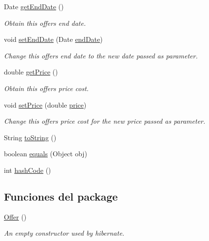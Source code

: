 \begin{DoxyCompactItemize}
Date \mbox{\hyperlink{classcom_1_1ruralhousejsf_1_1domain_1_1_offer_aa6adb6e4f0999247d9426233f62b2185}{get\+End\+Date}} ()
\begin{DoxyCompactList}\small\item\em Obtain this offers end date. \end{DoxyCompactList}\item 
void \mbox{\hyperlink{classcom_1_1ruralhousejsf_1_1domain_1_1_offer_a4ee5091e976e14c9b34817e1c8225e01}{set\+End\+Date}} (Date \mbox{\hyperlink{classcom_1_1ruralhousejsf_1_1domain_1_1_offer_a315f9b97f02da79a97fa489db212b5ce}{end\+Date}})
\begin{DoxyCompactList}\small\item\em Change this offers end date to the new date passed as parameter. \end{DoxyCompactList}\item 
double \mbox{\hyperlink{classcom_1_1ruralhousejsf_1_1domain_1_1_offer_a498e3f0617a7a097d68857ce20e6addd}{get\+Price}} ()
\begin{DoxyCompactList}\small\item\em Obtain this offers price cost. \end{DoxyCompactList}\item 
void \mbox{\hyperlink{classcom_1_1ruralhousejsf_1_1domain_1_1_offer_aaf77b7df1299a14ecc9cae2040dec6af}{set\+Price}} (double \mbox{\hyperlink{classcom_1_1ruralhousejsf_1_1domain_1_1_offer_a2106c38f0c490e3263b1364c3ac56b0a}{price}})
\begin{DoxyCompactList}\small\item\em Change this offers price cost for the new price passed as parameter. \end{DoxyCompactList}\item 
String \mbox{\hyperlink{classcom_1_1ruralhousejsf_1_1domain_1_1_offer_a91920170708c786730b8707d51d5a810}{to\+String}} ()
\item 
boolean \mbox{\hyperlink{classcom_1_1ruralhousejsf_1_1domain_1_1_offer_aea11cafbf3e7304d38630b80a3f4dc1e}{equals}} (Object obj)
\item 
int \mbox{\hyperlink{classcom_1_1ruralhousejsf_1_1domain_1_1_offer_aad4fd5441e084e41b30bb1d8d3597c48}{hash\+Code}} ()
\end{DoxyCompactItemize}
\subsection*{Funciones del \textquotesingle{}package\textquotesingle{}}
\begin{DoxyCompactItemize}
\item 
\mbox{\hyperlink{classcom_1_1ruralhousejsf_1_1domain_1_1_offer_aa25c14124afd5f3f53c26ef4a564397d}{Offer}} ()
\begin{DoxyCompactList}\small\item\em An empty constructor used by hibernate. \end{DoxyCompactList}\end{DoxyCompactItemize}
